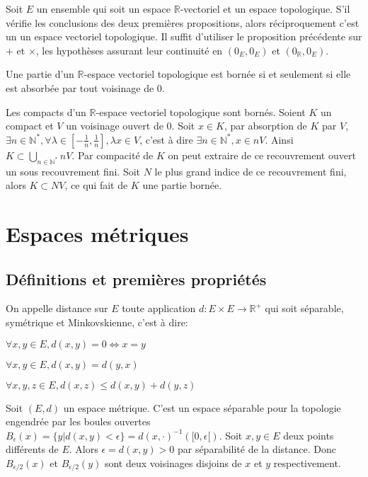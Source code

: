 \documentclass[a4paper, 11pt, french]{book}
\newenvironment{itemise}{\itemize}{\enditemize}
\theoremstyle{plain} %
\theoremstyle{definition} %
\theoremstyle{remark} %
\newcommand{\1}{\mathds{1}}
\newcommand{\infegal}{\leqslant}
\newcommand{\inv}[1]{#1^{-1}}
\newcommand{\N}{\mathbb{N}}
\newcommand{\R}{\mathbb{R}}
\begin{document}
\proposition
Soit $E$ un ensemble qui soit un espace $\R$-vectoriel et un espace topologique.
S'il vérifie les conclusions des deux premières propositions, alors réciproquement c'est un un espace vectoriel topologique.
\demonstration
Il suffit d'utiliser le proposition précédente sur $+$ et $\times$, les hypothèses assurant leur continuité en $(0_E, 0_E)$ et $(0_\R, 0_E)$.

Une partie d'un $\R$-espace vectoriel topologique est bornée si et seulement si elle est absorbée par tout voisinage de 0.

\proposition
Les compacts d'un $\R$-espace vectoriel topologique sont bornés.
\demonstration
Soient $K$ un compact et $V$ un voisinage ouvert de 0.
Soit $x\in K$, par absorption de $K$ par $V$, $\exists n\in\N^*, \forall\lambda\in[-\frac{1}{n}, \frac{1}{n}], \lambda x\in V$, c'est à dire $\exists n\in\N^*, x\in nV$.
Ainsi $K\subset\bigcup_{n\in\N^*}nV$.
Par compacité de $K$ on peut extraire de ce recouvrement ouvert un sous recouvrement fini.
Soit $N$ le plus grand indice de ce recouvrement fini, alors $K\subset NV$, ce qui fait de $K$ une partie bornée.

\chapter{Espaces métriques}

\section{Définitions et premières propriétés}

On appelle distance sur $E$ toute application $d:E\times E\rightarrow\R^+$ qui soit séparable, symétrique et Minkovskienne, c'est à dire:
\begin{itemise}
	\item $\forall x, y\in E, d(x, y)=0\iff x=y$
	\item $\forall x, y\in E, d(x, y)=d(y, x)$
	\item $\forall x, y, z\in E, d(x, z)\infegal d(x, y)+d(y, z)$
\end{itemise}

\proposition
Soit $(E, d)$ un espace métrique.
C'est un espace séparable pour la topologie engendrée par les boules ouvertes $B_\epsilon(x)=\{y|d(x, y)<\epsilon\}=\inv{d(x, \cdot)}([0, \epsilon[)$.
\demonstration
Soit $x, y\in E$ deux points différents de $E$.
Alors $\epsilon=d(x, y)>0$ par séparabilité de la distance.
Donc $B_{\epsilon/2}(x)$ et $B_{\epsilon/2}(y)$ sont deux voisinages disjoins de $x$ et $y$ respectivement.
\end{document}
